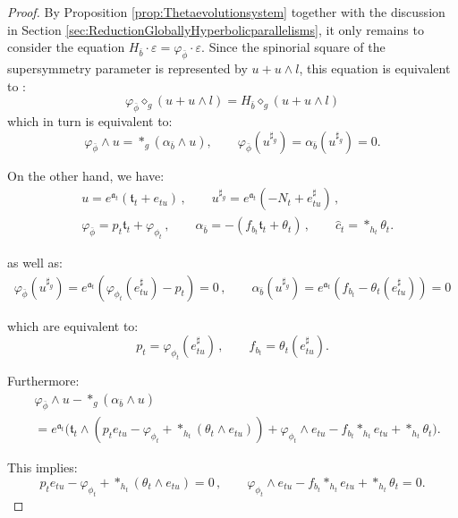 \documentclass[10pt,reqno,a4paper]{amsart}
\theoremstyle{plain}
\theoremstyle{definition}
\theoremstyle{remark}
\theoremstyle{remark}
\def\fra{\mathfrak{a}}
\renewcommand{\(}{ (}
\renewcommand{\)}{ )}
\begin{document}
\begin{proof}
By Proposition \ref{prop:Thetaevolutionsystem} together with the discussion in Section \ref{sec:ReductionGloballyHyperbolicparallelisms}, it only remains to consider the equation $H_{\bar{b}}\cdot\varepsilon=\varphi_{\bar\phi}\cdot\varepsilon$. Since the spinorial square of the supersymmetry parameter is represented by $u+u\wedge l$, this equation is equivalent to \cite{Cortes:2019xmk}:
\begin{equation*}
 \varphi_{\bar\phi}\diamond_g(u+u\wedge l)
 =H_{\bar b}\diamond_g(u+u\wedge l)
\end{equation*}
which in turn is equivalent to:
\begin{equation*}
 \varphi_{\bar\phi}\wedge u=\ast_g(\alpha_{\bar b}\wedge u),
 \qquad
 \varphi_{\bar\phi}(u^{\sharp_g})=\alpha_{\bar b}(u^{\sharp_g})=0.
\end{equation*}   

\noindent
On the other hand, we have:
\begin{eqnarray*}
& u=e^{\fra_t}(\mathfrak t_t+e_{tu})\, , \qquad u^{\sharp_g}=e^{\fra_t}(-N_t + e^{\sharp}_{tu})\, ,\\
& \varphi_{\bar\phi}=p_t\mathfrak t_t+\varphi_{\phi_t}\, , \qquad \alpha_{\bar b}=-(f_{b_t}\mathfrak t_t+\theta_t)\, , \qquad \widehat{c}_t =\ast_{h_t}\theta_t.
\end{eqnarray*}

\noindent
as well as:
\begin{eqnarray*}
\varphi_{\bar\phi}(u^{\sharp_g})=e^{\fra_t}(\varphi_{\phi_t}(e^{\sharp}_{tu})-p_t)=0\, , \qquad
\alpha_{\bar b}(u^{\sharp_g})=e^{\fra_t}(f_{b_t}-\theta_t(e^{\sharp}_{tu}))=0
\end{eqnarray*}

\noindent
which are equivalent to:
\begin{equation*}
p_t=\varphi_{\phi_t}(e^{\sharp}_{tu})\, , \qquad f_{b_t}=\theta_t(e^{\sharp}_{tu}).
\end{equation*}

\noindent
Furthermore:
\begin{eqnarray*}
& \varphi_{\bar\phi}\wedge u-\ast_g(\alpha_{\bar b}\wedge u)\\
& =e^{\fra_t}\big(\mathfrak t_t\wedge(p_t e_{tu}-\varphi_{\phi_t}+\ast_{h_t}(\theta_t\wedge e_{tu}))+\varphi_{\phi_t}\wedge e_{tu}-f_{b_t}\ast_{h_t}e_{tu}+\ast_{h_t}\theta_t\big).
\end{eqnarray*}

\noindent
This implies:
\begin{equation*}
p_t e_{tu}-\varphi_{\phi_t}+\ast_{h_t}(\theta_t\wedge e_{tu})=0\, , \qquad
\varphi_{\phi_t}\wedge e_{tu}-f_{b_t}\ast_{h_t}e_{tu}+\ast_{h_t}\theta_t=0.
\end{equation*}


\end{proof}
\end{document}
